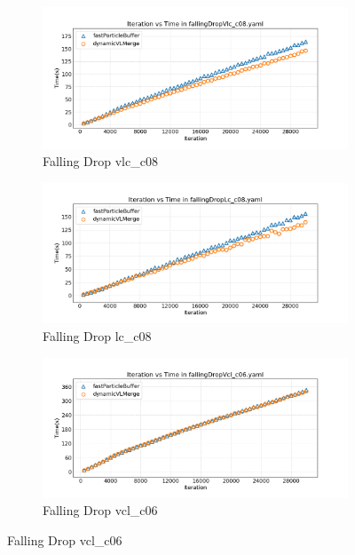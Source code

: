 \begin{figure}[htbp]
    \centering
    \vspace{-0.5em}
    \begin{subfigure}[b]{\textwidth}
        \centering
        \includegraphics[width=0.9\linewidth]{graphs/fallingDrop/normalExperiments/iter/vlcc08.png}
        \vspace{-0.5em}
        \caption{\scriptsize Falling Drop vlc\_c08}
        \label{fig:vlcc08fallingDropIter}
    \end{subfigure}

    \begin{subfigure}[b]{\textwidth}
        \centering
        \includegraphics[width=0.9\linewidth]{graphs/fallingDrop/normalExperiments/iter/lcc08.png}
        \vspace{-0.5em}
        \caption{\scriptsize Falling Drop lc\_c08}
        \label{fig:lcc08fallingDropIter}
    \end{subfigure}

    \begin{subfigure}[b]{\textwidth}
        \centering
        \includegraphics[width=0.9\linewidth]{graphs/fallingDrop/normalExperiments/iter/vclc06.png}
        \vspace{-0.5em}
        \caption{\scriptsize Falling Drop vcl\_c06}
        \label{fig:vclc06fallingDropIter}
    \end{subfigure}


\end{figure}
